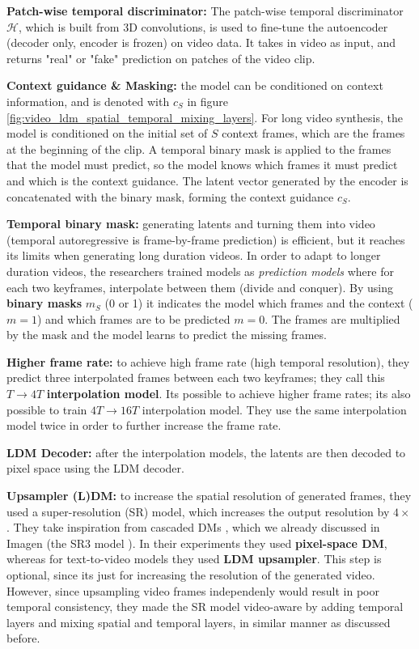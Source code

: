 \textbf{Patch-wise temporal discriminator:} The patch-wise temporal discriminator $\mathcal{H}$, which is built from 3D convolutions, is used to fine-tune the autoencoder (decoder only, encoder is frozen) on video data. It takes in video as input, and returns "real" or "fake" prediction on patches of the video clip.

\textbf{Context guidance \& Masking:} the model can be conditioned on context information, and is denoted with $c_S$ in figure \ref{fig:video_ldm_spatial_temporal_mixing_layers}. For long video synthesis, the model is conditioned on the initial set of $S$ context frames, which are the frames at the beginning of the clip. A temporal binary mask is applied to the frames that the model must predict, so the model knows which frames it must predict and which is the context guidance. The latent vector generated by the encoder is concatenated with the binary mask, forming the context guidance $c_S$.

\textbf{Temporal binary mask:} generating latents and turning them into video (temporal autoregressive is frame-by-frame prediction) is efficient, but it reaches its limits when generating long duration videos. In order to adapt to longer duration videos, the researchers trained models as \textit{prediction models} where for each two keyframes, interpolate between them (divide and conquer). By using \textbf{binary masks} $m_S$ (0 or 1) it indicates the model which frames and the context ($m = 1$) and which frames are to be predicted $m = 0$. The frames are multiplied by the mask and the model learns to predict the missing frames.

\textbf{Higher frame rate:} to achieve high frame rate (high temporal resolution), they predict three interpolated frames between each two keyframes; they call this $T \rightarrow 4T$ \textbf{interpolation model}. Its possible to achieve higher frame rates; its also possible to train $4T \rightarrow 16T$ interpolation model. They use the same interpolation model twice in order to further increase the frame rate.

\textbf{LDM Decoder: } after the interpolation models, the latents are then decoded to pixel space using the LDM decoder.

\textbf{Upsampler (L)DM: } to increase the spatial resolution of generated frames, they used a super-resolution (SR) model, which increases the output resolution by $4 \times $. They take inspiration from cascaded DMs \cite{cascaded_diffusion_models}, which we already discussed in Imagen (the SR3 model \cite{sr3}). In their experiments they used \textbf{pixel-space DM}, whereas for text-to-video models they used \textbf{LDM upsampler}. This step is optional, since its just for increasing the resolution of the generated video. However, since upsampling video frames independenly would result in poor temporal consistency, they made the SR model video-aware by adding temporal layers and mixing spatial and temporal layers, in similar manner as discussed before.

